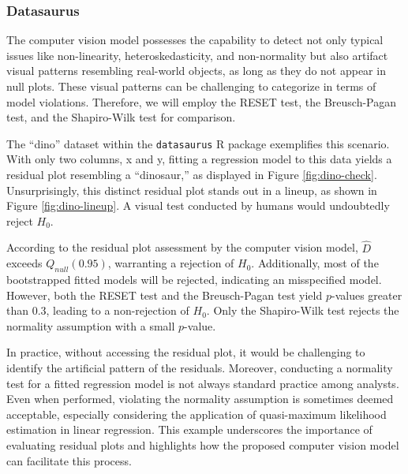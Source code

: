 \documentclass[]{interact}
\theoremstyle{plain}%
\theoremstyle{definition}
\theoremstyle{remark}
\begin{document}
\subsubsection{Datasaurus}\label{datasaurus}

The computer vision model possesses the capability to detect not only
typical issues like non-linearity, heteroskedasticity, and non-normality
but also artifact visual patterns resembling real-world objects, as long
as they do not appear in null plots. These visual patterns can be
challenging to categorize in terms of model violations. Therefore, we
will employ the RESET test, the Breusch-Pagan test, and the Shapiro-Wilk
test \citep{shapiro1965analysis} for comparison.

The ``dino'' dataset within the \texttt{datasaurus} R package
exemplifies this scenario. With only two columns, x and y, fitting a
regression model to this data yields a residual plot resembling a
``dinosaur,'' as displayed in Figure \ref{fig:dino-check}.
Unsurprisingly, this distinct residual plot stands out in a lineup, as
shown in Figure \ref{fig:dino-lineup}. A visual test conducted by humans
would undoubtedly reject \(H_0\).

According to the residual plot assessment by the computer vision model,
\(\hat{D}\) exceeds \(Q_{null}(0.95)\), warranting a rejection of
\(H_0\). Additionally, most of the bootstrapped fitted models will be
rejected, indicating an misspecified model. However, both the RESET test
and the Breusch-Pagan test yield \(p\)-values greater than 0.3, leading
to a non-rejection of \(H_0\). Only the Shapiro-Wilk test rejects the
normality assumption with a small \(p\)-value.

In practice, without accessing the residual plot, it would be
challenging to identify the artificial pattern of the residuals.
Moreover, conducting a normality test for a fitted regression model is
not always standard practice among analysts. Even when performed,
violating the normality assumption is sometimes deemed acceptable,
especially considering the application of quasi-maximum likelihood
estimation in linear regression. This example underscores the importance
of evaluating residual plots and highlights how the proposed computer
vision model can facilitate this process.
\end{document}

